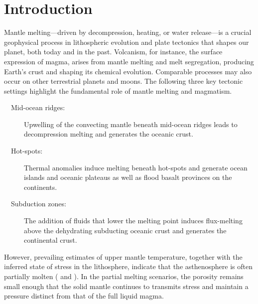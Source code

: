 \chapter[Introduction]{Introduction}
\label{intro}

Mantle melting—driven by decompression, heating, or water release—is a crucial geophysical 
process in lithospheric evolution and plate tectonics that shapes our planet, both today and in the past.
Volcanism, for instance, the surface expression of magma, arises from mantle melting and melt segregation, 
producing Earth’s crust and shaping its chemical evolution.
Comparable processes may also occur on other terrestrial planets and moons.
The following three key tectonic settings highlight the fundamental role of mantle melting
and magmatism.
\vspace*{-6pt}\begin{description}  
 \item[\ \ Mid-ocean ridges:] Upwelling of the convecting mantle beneath mid-ocean ridges leads to
   decompression melting and generates the oceanic crust.
 \item[\ \ Hot-spots:] Thermal anomalies induce melting beneath hot-spots and generate ocean islands
   and oceanic plateaus as well as flood basalt provinces on the continents.
 \item[\ \ Subduction zones:] The addition of fluids that lower the melting point induces
   flux-melting above the dehydrating subducting oceanic crust and generates the continental crust.
\end{description}\vspace*{-6pt}

However, prevailing estimates of upper mantle temperature, together with the 
inferred state of stress in the lithosphere,
indicate that the asthenosphere is often partially molten 
(\cite{MagmaPhysics} and \cite{Schmeling2000}).  
In the partial melting scenarios, the porosity remains small enough
that the solid mantle continues to transmits stress and maintain a pressure
distinct from that of the full liquid magma. 

